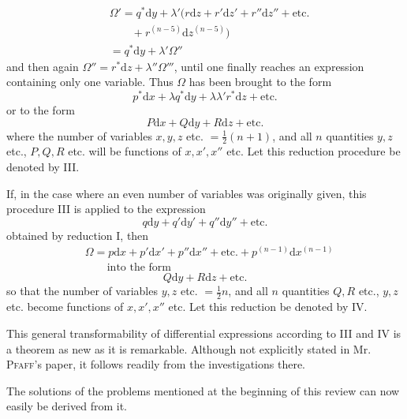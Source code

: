 \[
\begin{aligned}
&\Omega'=q^{*}\mathrm{d}y+\lambda'(r\mathrm{d}z+r'\mathrm{d}z'+r''\mathrm{d}z''+\mathrm{etc.}\\&\qquad+r^{(n-5)}\mathrm{d}z^{(n-5)})\\
&=q^{*}\mathrm{d}y+\lambda'\Omega''
\end{aligned}
\]
and then again $\Omega''=r^{*}\mathrm{d}z+\lambda''\Omega'''$, until one finally reaches an expression containing only one variable. Thus $\Omega$ has been brought to the form
\[
p^{*}\mathrm{d}x+\lambda q^{*}\mathrm{d}y+\lambda\lambda'r^{*}\mathrm{d}z+\mathrm{etc.}
\]
or to the form
\[
P\mathrm{d}x+Q\mathrm{d}y+R\mathrm{d}z+\mathrm{etc.}
\]
where the number of variables $x,y,z$ etc. $=\frac12(n+1)$, and all $n$ quantities $y,z$ etc., $P,Q,R$ etc. will be functions of $x,x',x''$ etc. Let this reduction procedure be denoted by III.

If, in the case where an even number of variables was originally given, this procedure III is applied to the expression
\[
q\mathrm{d}y+q'\mathrm{d}y'+q''\mathrm{d}y''+\mathrm{etc.}
\]
obtained by reduction I, then
\[
\begin{aligned}&\Omega=p\mathrm{d}x+p'\mathrm{d}x'+p''\mathrm{d}x''+\mathrm{etc.}
+p^{(n-1)}\mathrm{d}x^{(n-1)}\\&\qquad\text{into the form}\end{aligned}
\]
\[
Q\mathrm{d}y+R\mathrm{d}z+\mathrm{etc.}
\]
so that the number of variables $y,z$ etc. $=\frac12 n$, and all $n$ quantities $Q,R$ etc., $y,z$ etc. become functions of $x,x',x''$ etc. Let this reduction be denoted by IV.

This general transformability of differential expressions according to III and IV is a theorem as new as it is remarkable. Although not explicitly stated in Mr. \textsc{Pfaff}'s paper, it follows readily from the investigations there.

The solutions of the problems mentioned at the beginning of this review can now easily be derived from it.

